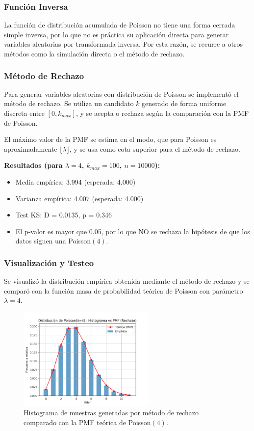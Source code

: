\documentclass{article}
\begin{document}
\subsubsection*{Función Inversa}
La función de distribución acumulada de Poisson no tiene una forma cerrada simple inversa, por lo que no es práctica su aplicación directa para generar variables aleatorias por transformada inversa. Por esta razón, se recurre a otros métodos como la simulación directa o el método de rechazo.

\subsubsection{Método de Rechazo}

Para generar variables aleatorias con distribución de Poisson se implementó el método de rechazo. Se utiliza un candidato $k$ generado de forma uniforme discreta entre $[0, k_{max}]$, y se acepta o rechaza según la comparación con la PMF de Poisson.

El máximo valor de la PMF se estima en el modo, que para Poisson es aproximadamente $\lfloor \lambda \rfloor$, y se usa como cota superior para el método de rechazo.

\textbf{Resultados (para $\lambda=4$, $k_{max}=100$, $n=10000$):}
\begin{itemize}
    \item Media empírica: 3.994 (esperada: 4.000)
    \item Varianza empírica: 4.007 (esperada: 4.000)
    \item Test KS: D = 0.0135, p = 0.346
    \item El p-valor es mayor que 0.05, por lo que NO se rechaza la hipótesis de que los datos siguen una Poisson$(4)$.
\end{itemize}

\vspace{0.5em}
\subsubsection{Visualización y Testeo}

Se visualizó la distribución empírica obtenida mediante el método de rechazo y se comparó con la función masa de probabilidad teórica de Poisson con parámetro $\lambda=4$.

\begin{figure}[H]
    \centering
    \includegraphics[width=0.6\textwidth]{visualizaciones/poisson_rechazo.png}
    \caption{Histograma de muestras generadas por método de rechazo comparado con la PMF teórica de Poisson$(4)$.}
    \label{fig:poisson_rechazo}
\end{figure}
\end{document}
